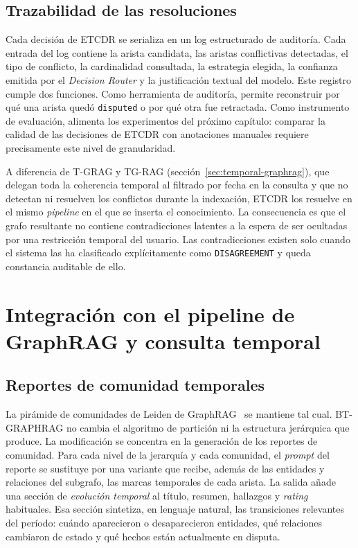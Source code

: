\subsection{Trazabilidad de las resoluciones}

Cada decisión de ETCDR se serializa en un log estructurado de auditoría. Cada entrada del log contiene la arista candidata, las aristas conflictivas detectadas, el tipo de conflicto, la cardinalidad consultada, la estrategia elegida, la confianza emitida por el \emph{Decision Router} y la justificación textual del modelo. Este registro cumple dos funciones. Como herramienta de auditoría, permite reconstruir por qué una arista quedó \texttt{disputed} o por qué otra fue retractada. Como instrumento de evaluación, alimenta los experimentos del próximo capítulo: comparar la calidad de las decisiones de ETCDR con anotaciones manuales requiere precisamente este nivel de granularidad.

A diferencia de T-GRAG y TG-RAG (sección~\ref{sec:temporal-graphrag}), que delegan toda la coherencia temporal al filtrado por fecha en la consulta y que no detectan ni resuelven los conflictos durante la indexación, ETCDR los resuelve en el mismo \emph{pipeline} en el que se inserta el conocimiento. La consecuencia es que el grafo resultante no contiene contradicciones latentes a la espera de ser ocultadas por una restricción temporal del usuario. Las contradicciones existen solo cuando el sistema las ha clasificado explícitamente como \texttt{DISAGREEMENT} y queda constancia auditable de ello.

\section{Integración con el pipeline de GraphRAG y consulta temporal}\label{sec:bt-integration}

\subsection{Reportes de comunidad temporales}

La pirámide de comunidades de Leiden de GraphRAG~\cite{edge2024local} se mantiene tal cual. BT-GRAPHRAG no cambia el algoritmo de partición ni la estructura jerárquica que produce. La modificación se concentra en la generación de los reportes de comunidad. Para cada nivel de la jerarquía y cada comunidad, el \emph{prompt} del reporte se sustituye por una variante que recibe, además de las entidades y relaciones del subgrafo, las marcas temporales de cada arista. La salida añade una sección de \emph{evolución temporal} al título, resumen, hallazgos y \emph{rating} habituales. Esa sección sintetiza, en lenguaje natural, las transiciones relevantes del período: cuándo aparecieron o desaparecieron entidades, qué relaciones cambiaron de estado y qué hechos están actualmente en disputa.

